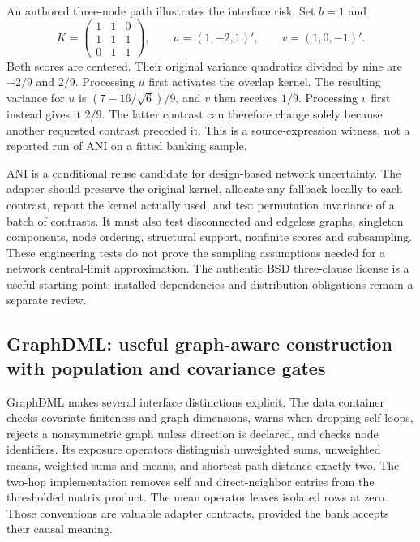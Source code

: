 An authored three-node path illustrates the interface risk. Set $b=1$ and
\[
 K=\begin{pmatrix}1&1&0\\1&1&1\\0&1&1\end{pmatrix},
 \qquad u=(1,-2,1)',\qquad v=(1,0,-1)'.
\]
Both scores are centered. Their original variance quadratics divided by nine are $-2/9$ and $2/9$. Processing $u$ first activates the overlap kernel. The resulting variance for $u$ is $(7-16/\sqrt6)/9$, and $v$ then receives $1/9$. Processing $v$ first instead gives it $2/9$. The latter contrast can therefore change solely because another requested contrast preceded it. This is a source-expression witness, not a reported run of ANI on a fitted banking sample.~\citep{exec25_pnet_choice}

ANI is a conditional reuse candidate for design-based network uncertainty. The adapter should preserve the original kernel, allocate any fallback locally to each contrast, report the kernel actually used, and test permutation invariance of a batch of contrasts. It must also test disconnected and edgeless graphs, singleton components, node ordering, structural support, nonfinite scores and subsampling. These engineering tests do not prove the sampling assumptions needed for a network central-limit approximation. The authentic BSD three-clause license is a useful starting point; installed dependencies and distribution obligations remain a separate review.~\citep{exec25_pnet_ani,exec25_pnet_choice}

\subsection{GraphDML: useful graph-aware construction with population and covariance gates}

GraphDML makes several interface distinctions explicit. The data container checks covariate finiteness and graph dimensions, warns when dropping self-loops, rejects a nonsymmetric graph unless direction is declared, and checks node identifiers. Its exposure operators distinguish unweighted sums, unweighted means, weighted sums and means, and shortest-path distance exactly two. The two-hop implementation removes self and direct-neighbor entries from the thresholded matrix product. The mean operator leaves isolated rows at zero. Those conventions are valuable adapter contracts, provided the bank accepts their causal meaning.~\citep{exec25_pnet_dml}

